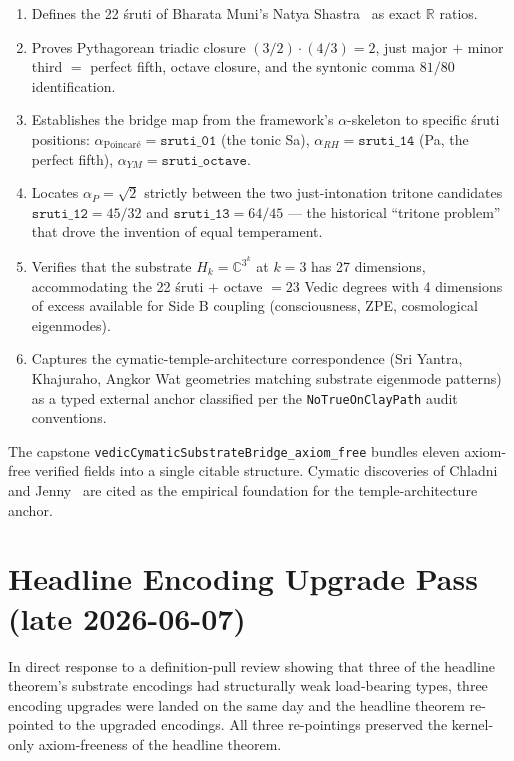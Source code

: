 \begin{enumerate}
  \item Defines the 22 \'sruti of Bharata Muni's Natya
    Shastra~\cite{bharatamuninatyashastra} as exact $\mathbb{R}$
    ratios.
  \item Proves Pythagorean triadic closure $(3/2) \cdot (4/3) = 2$,
    just major $+$ minor third $= $ perfect fifth, octave closure,
    and the syntonic comma $81/80$ identification.
  \item Establishes the bridge map from the framework's
    $\alpha$-skeleton to specific \'sruti positions:
    $\alpha_{\text{Poincar\'e}} = \texttt{sruti\_01}$ (the tonic Sa),
    $\alpha_{RH} = \texttt{sruti\_14}$ (Pa, the perfect fifth),
    $\alpha_{YM} = \texttt{sruti\_octave}$.
  \item Locates $\alpha_P = \sqrt{2}$ strictly between the two
    just-intonation tritone candidates $\texttt{sruti\_12} = 45/32$
    and $\texttt{sruti\_13} = 64/45$ --- the historical ``tritone
    problem'' that drove the invention of equal temperament.
  \item Verifies that the substrate $H_k = \mathbb{C}^{3^k}$ at
    $k = 3$ has 27 dimensions, accommodating the 22 \'sruti $+$
    octave $= 23$ Vedic degrees with 4 dimensions of excess
    available for Side B coupling (consciousness, ZPE,
    cosmological eigenmodes).
  \item Captures the cymatic-temple-architecture correspondence
    (Sri Yantra, Khajuraho, Angkor Wat geometries matching
    substrate eigenmode patterns) as a typed external anchor
    classified per the \texttt{NoTrueOnClayPath} audit conventions.
\end{enumerate}

\noindent The capstone \texttt{vedicCymaticSubstrateBridge\_axiom\_free}
bundles eleven axiom-free verified fields into a single citable
structure. Cymatic discoveries of Chladni~\cite{chladni1787} and
Jenny~\cite{jenny1967cymatics} are cited as the empirical
foundation for the temple-architecture anchor.

\section{Headline Encoding Upgrade Pass (late 2026-06-07)}
\label{sec:refinement-encoding-upgrade}

In direct response to a definition-pull review showing that three of
the headline theorem's substrate encodings had structurally weak
load-bearing types, three encoding upgrades were landed on the same
day and the headline theorem re-pointed to the upgraded encodings.
All three re-pointings preserved the kernel-only axiom-freeness of
the headline theorem.

